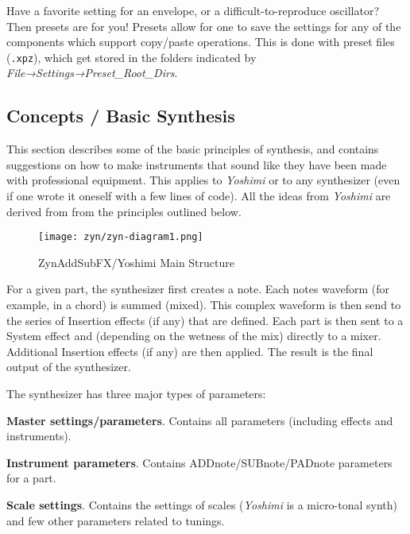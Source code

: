   Have a favorite setting for an envelope, or a difficult-to-reproduce
   oscillator? Then presets are for you! Presets allow for one to save the
   settings for any of the components which support copy/paste operations.
   This is done with preset files (\texttt{.xpz}), which get stored in the
   folders indicated by \textsl{File→Settings→Preset\_Root\_Dirs}.

\subsection{Concepts / Basic Synthesis}
\label{subsec:concepts_basics}

   This section describes some of the basic principles of synthesis,
   and contains suggestions on
   how to make instruments that sound like they have been made with
   professional equipment. This applies to \textsl{Yoshimi} or to any
   synthesizer (even if one wrote it oneself with a few lines of code). All
   the ideas from \textsl{Yoshimi} are derived from from the principles
   outlined below.

\begin{figure}[H]
   \centering 
   \texttt{[image: zyn/zyn-diagram1.png]}
   \caption{ZynAddSubFX/Yoshimi Main Structure}
   \label{fig:zynaddsubfx_main_structure}
\end{figure}

   For a given part, the synthesizer first creates a note.  Each notes
   waveform (for example, in a chord) is summed (mixed).  This complex
   waveform is then send to the series of Insertion effects (if any) that
   are defined.  Each part is then sent to a System effect and (depending on
   the wetness of the mix) directly to a mixer.  Additional Insertion
   effects (if any) are then applied.  The result is the final output of the
   synthesizer.

   The synthesizer has three major types of parameters: 

   \begin{enumber}
      \item \textbf{Master settings/parameters}.
         Contains all parameters (including effects and instruments).
      \item \textbf{Instrument parameters}.
         Contains ADDnote/SUBnote/PADnote parameters for a part.
      \item \textbf{Scale settings}.
         Contains the settings of scales (\textsl{Yoshimi}
         is a micro-tonal synth) and few other parameters related to
         tunings.
   \end{enumber}

